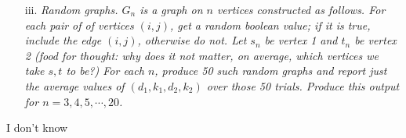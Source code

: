 \documentclass[12pt]{article} \setlength{\oddsidemargin}{0in}
\begin{document}
\begin{enumerate}
{\begin{enumerate}
\item[iii.] \textit{Random graphs. $G_n$ is a graph on $n$ vertices constructed as follows. For each
pair of of vertices $(i, j)$, get a random boolean value; if it is true, include
the edge $(i, j)$, otherwise do not. Let $s_n$ be vertex 1 and $t_n$ be vertex 2 (food
for thought: why does it not matter, on average, which vertices we take $s, t$
to be?) For each $n$, produce 50 such random graphs and report just the
average values of $(d_1, k_ 1, d_2, k_2 )$ over those 50 trials. Produce this output for $n = 3, 4, 5, \cdots, 20$.}
    \end{enumerate}
  }

  I don't know

\end{enumerate}



\end{document}
